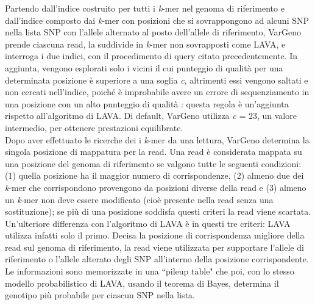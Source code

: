 \documentclass[../main.tex]{subfiles}
\begin{document}
\noindent
Partendo dall'indice costruito per tutti i \textit{k}-mer nel genoma di riferimento e dall'indice composto dai \textit{k}-mer con posizioni che si sovrappongono ad alcuni SNP nella lista SNP con l'allele alternato al posto dell'allele di riferimento, VarGeno prende ciascuna read, la suddivide in \textit{k}-mer non sovrapposti come LAVA, e interroga i due indici, con il procedimento di query citato precedentemente. In aggiunta, vengono esplorati solo i vicini il cui punteggio di qualità per una determinata posizione è superiore a una soglia \textit{c}, altrimenti essi vengono saltati e non cercati nell'indice, poiché è improbabile avere un errore di sequenziamento in una posizione con un alto punteggio di qualità \cite{sun-medvedev2018vargeno}: questa regola è un'aggiunta rispetto all'algoritmo di LAVA. Di default, VarGeno utilizza \textit{c} = 23, un valore intermedio, per ottenere prestazioni equilibrate. \\

\noindent
Dopo aver effettuato le ricerche dei i \textit{k}-mer da una lettura, VarGeno determina la singola posizione di mappatura per la read. Una read è considerata mappata su una posizione del genoma di riferimento se valgono tutte le seguenti condizioni: (1) quella posizione ha il maggior numero di corrispondenze, (2) almeno due dei \textit{k}-mer che corrispondono provengono da posizioni diverse della read e (3) almeno un \textit{k}-mer non deve essere modificato (cioè presente nella read senza una sostituzione); se più di una posizione soddisfa questi criteri la read viene scartata. Un'ulteriore differenza con l'algoritmo di LAVA è in questi tre criteri: LAVA utilizza infatti solo il primo. Decisa la posizione di corrispondenza migliore della read sul genoma di riferimento, la read viene utilizzata per supportare l'allele di riferimento o l'allele alterato degli SNP all'interno della posizione corrispondente. Le informazioni sono memorizzate in una ``pileup table" che poi, con lo stesso modello probabilistico di LAVA, usando il teorema di Bayes, determina il genotipo più probabile per ciascun SNP nella lista.
\end{document}
